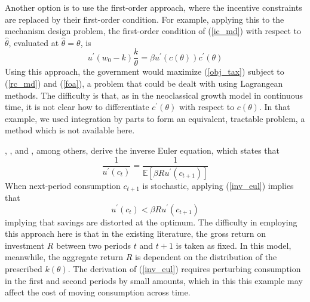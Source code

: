 \documentclass[11pt]{article}
\newcommand{\p}{\prime}
\newcommand{\ev}{\mathbb{E}}
\begin{document}
Another option is to use the first-order approach, where the incentive constraints are replaced by their first-order condition. For example, applying this to the mechanism design problem, the first-order condition of (\ref{ic_md}) with respect to \( \hat{\theta} \), evaluated at \( \hat{\theta} = \theta \), is 
\begin{equation}
    u^\p(w_0 - k)\frac{k}{\theta} = \beta u^\p(c(\theta))c^\p(\theta) \label{foa}
\end{equation}
Using this approach, the government would maximize (\ref{obj_tax}) subject to (\ref{rc_md}) and (\ref{foa}), a problem that could be dealt with using Lagrangean methods. The difficulty is that, as in the neoclassical growth model in continuous time, it is not clear how to differentiate \( c^\p(\theta) \) with respect to \( c(\theta) \). In that example, we used integration by parts to form an equivalent, tractable problem, a method which is not available here. 

\cite{golosov2003optimal}, \cite{golosov2006new}, and \cite{kocherlakota2010new}, among others, derive the inverse Euler equation, which states that 
\begin{equation}
    \frac{1}{u^\p(c_t)} = \frac{1}{\ev\left[ \beta R u^\p(c_{t+1}) \right]} \label{inv_eul}
\end{equation}
When next-period consumption \( c_{t+1} \) is stochastic, applying (\ref{inv_eul}) implies that 
\begin{equation}
    u^\p(c_t) < \beta R u^\p(c_{t+1})
\end{equation}
implying that savings are distorted at the optimum. The difficulty in employing this approach here is that in the existing literature, the gross return on investment \( R \) between two periods \( t \) and \( t+1 \) is taken as fixed. In this model, meanwhile, the aggregate return \( R \) is dependent on the distribution of the prescribed \( k(\theta) \). The derivation of (\ref{inv_eul}) requires perturbing consumption in the first and second periods by small amounts, which in this this example may affect the cost of moving consumption across time. 



\end{document}
